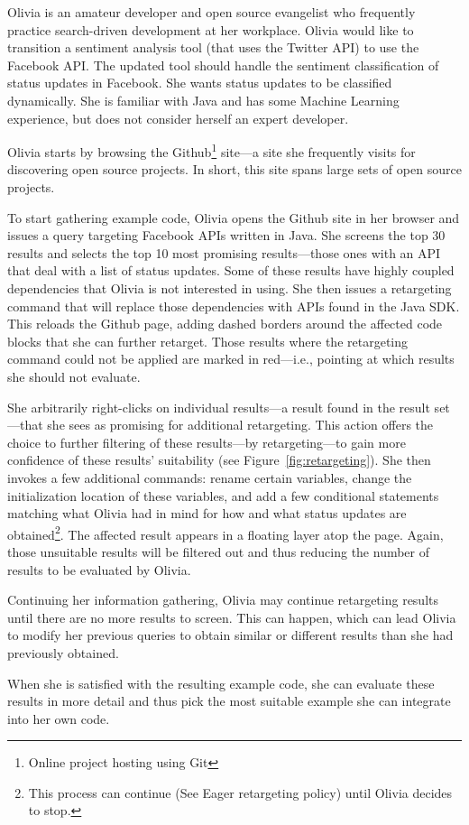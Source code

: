 Olivia is an amateur developer and open source evangelist who frequently practice search-driven development at her workplace. Olivia would like to transition a sentiment analysis tool (that uses the Twitter API) to use the Facebook API. The updated tool should handle the sentiment classification of status updates in Facebook. She wants status updates to be classified dynamically. She is familiar with Java and has some Machine Learning experience, but does not consider herself an expert developer.

Olivia starts by browsing the Github\footnote{Online project hosting using Git} site---a site she frequently visits for discovering open source projects. In short, this site spans large sets of open source projects.

To start gathering example code, Olivia opens the Github site in her browser and issues a query targeting Facebook APIs written in Java. She screens the top 30 results and selects the top 10 most promising results---those ones with an API that deal with a list of status updates. Some of these results have highly coupled dependencies that Olivia is not interested in using. She then issues a retargeting command that will replace those dependencies with APIs found in the Java SDK. This reloads the Github page, adding dashed borders around the affected code blocks that she can further retarget. Those results where the retargeting command could not be applied are marked in red---i.e., pointing at which results she should not evaluate.

She arbitrarily right-clicks on individual results---a result found in the result set---that she sees as promising for additional retargeting. This action offers the choice to further filtering of these results---by retargeting---to gain more confidence of these results' suitability (see Figure~\ref{fig:retargeting}). She then invokes a few additional commands: rename certain variables, change the initialization location of these variables, and add a few conditional statements matching what Olivia had in mind for how and what status updates are obtained\footnote{This process can continue (See Eager retargeting policy) until Olivia decides to stop.}. The affected result appears in a floating layer atop the page. Again, those unsuitable results will be filtered out and thus reducing the number of results to be evaluated by Olivia.

Continuing her information gathering, Olivia may continue retargeting results until there are no more results to screen. This can happen, which can lead Olivia to modify her previous queries to obtain similar or different results than she had previously obtained.

When she is satisfied with the resulting example code, she can evaluate these results in more detail and thus pick the most suitable example she can integrate into her own code.

